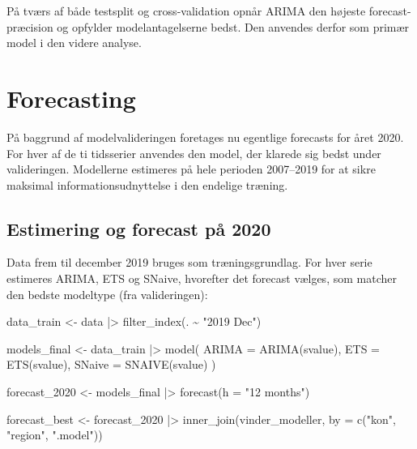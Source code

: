 \documentclass[
]{article}
\newenvironment{Shaded}{\begin{snugshade}}{\end{snugshade}}
\newcommand{\AttributeTok}[1]{\textcolor[rgb]{0.40,0.45,0.13}{#1}}
\newcommand{\FunctionTok}[1]{\textcolor[rgb]{0.28,0.35,0.67}{#1}}
\newcommand{\NormalTok}[1]{\textcolor[rgb]{0.00,0.23,0.31}{#1}}
\newcommand{\OtherTok}[1]{\textcolor[rgb]{0.00,0.23,0.31}{#1}}
\newcommand{\SpecialCharTok}[1]{\textcolor[rgb]{0.37,0.37,0.37}{#1}}
\newcommand{\StringTok}[1]{\textcolor[rgb]{0.13,0.47,0.30}{#1}}
\begin{document}
På tværs af både testsplit og cross-validation opnår ARIMA den højeste
forecast-præcision og opfylder modelantagelserne bedst. Den anvendes
derfor som primær model i den videre analyse.

\section{Forecasting}\label{forecasting}

På baggrund af modelvalideringen foretages nu egentlige forecasts for
året 2020. For hver af de ti tidsserier anvendes den model, der klarede
sig bedst under valideringen. Modellerne estimeres på hele perioden
2007--2019 for at sikre maksimal informationsudnyttelse i den endelige
træning.

\subsection{Estimering og forecast på
2020}\label{estimering-og-forecast-puxe5-2020}

Data frem til december 2019 bruges som træningsgrundlag. For hver serie
estimeres ARIMA, ETS og SNaive, hvorefter det forecast vælges, som
matcher den bedste modeltype (fra valideringen):

\begin{Shaded}
\begin{Highlighting}[]
\NormalTok{data\_train }\OtherTok{\textless{}{-}}\NormalTok{ data }\SpecialCharTok{|\textgreater{}} \FunctionTok{filter\_index}\NormalTok{(. }\SpecialCharTok{\textasciitilde{}} \StringTok{"2019 Dec"}\NormalTok{)}

\NormalTok{models\_final }\OtherTok{\textless{}{-}}\NormalTok{ data\_train }\SpecialCharTok{|\textgreater{}} 
  \FunctionTok{model}\NormalTok{(}
    \AttributeTok{ARIMA  =} \FunctionTok{ARIMA}\NormalTok{(svalue),}
    \AttributeTok{ETS    =} \FunctionTok{ETS}\NormalTok{(svalue),}
    \AttributeTok{SNaive =} \FunctionTok{SNAIVE}\NormalTok{(svalue)}
\NormalTok{  )}

\NormalTok{forecast\_2020 }\OtherTok{\textless{}{-}}\NormalTok{ models\_final }\SpecialCharTok{|\textgreater{}} \FunctionTok{forecast}\NormalTok{(}\AttributeTok{h =} \StringTok{"12 months"}\NormalTok{)}

\NormalTok{forecast\_best }\OtherTok{\textless{}{-}}\NormalTok{ forecast\_2020 }\SpecialCharTok{|\textgreater{}} 
  \FunctionTok{inner\_join}\NormalTok{(vinder\_modeller, }\AttributeTok{by =} \FunctionTok{c}\NormalTok{(}\StringTok{"kon"}\NormalTok{, }\StringTok{"region"}\NormalTok{, }\StringTok{".model"}\NormalTok{))}
\end{Highlighting}
\end{Shaded}
\end{document}
